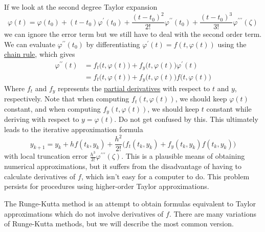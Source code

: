 \documentclass{article}
\begin{document}
    If we look at the second degree Taylor expansion 
    \begin{equation}
      \varphi(t) = \varphi(t_0) + (t - t_0) \varphi^\prime (t_0) + \frac{(t - t_0)^2}{2!} \varphi^{\prime\prime} (t_0) + \frac{(t - t_0)^3}{3!} \varphi^{\prime\prime\prime} (\zeta)
    \end{equation}
    we can ignore the error term but we still have to deal with the second order term. We can evaluate $\varphi^{\prime\prime} (t_0)$ by differentiating $\varphi^\prime (t) = f(t, \varphi(t))$ using the \hyperref[mv-thm:chain-rule]{chain rule}, which gives
    \begin{align*}
        \varphi^{\prime\prime} (t) & = f_t \big( t, \varphi(t)\big) + f_y \big(t, \varphi(t)\big) \varphi^\prime (t) \\
        & = f_t \big(t, \varphi(t)\big) + f_y \big( t, \varphi(t)\big) f\big(t, \varphi(t)\big)
    \end{align*}
    Where $f_t$ and $f_y$ represents the \hyperref[mv-def:partial-derivative]{partial derivatives} with respect to $t$ and $y$, respectively. Note that when computing $f_t (t, \varphi(t))$, we should keep $\varphi(t)$ constant, and when computing $f_y (t, \varphi(t))$, we should keep $t$ constant while deriving with respect to $y = \varphi(t)$. Do not get confused by this. This ultimately leads to the iterative approximation formula
    \begin{equation}
      y_{k+1} = y_k + h f(t_k, y_k) + \frac{h^2}{2!} \big( f_t (t_k, y_k) + f_y (t_k, y_k) f(t_k, y_k)\big)
    \end{equation}
    with local truncation error $\frac{h^3}{3!} \varphi^{\prime\prime\prime} (\zeta)$. This is a plausible means of obtaining numerical approximations, but it suffers from the disadvantage of having to calculate derivatives of $f$, which isn't easy for a computer to do. This problem persists for procedures using higher-order Taylor approximations. 

    The Runge-Kutta method is an attempt to obtain formulas equivalent to Taylor approximations which do not involve derivatives of $f$. There are many variations of Runge-Kutta methods, but we will describe the most common version. 
\end{document}
